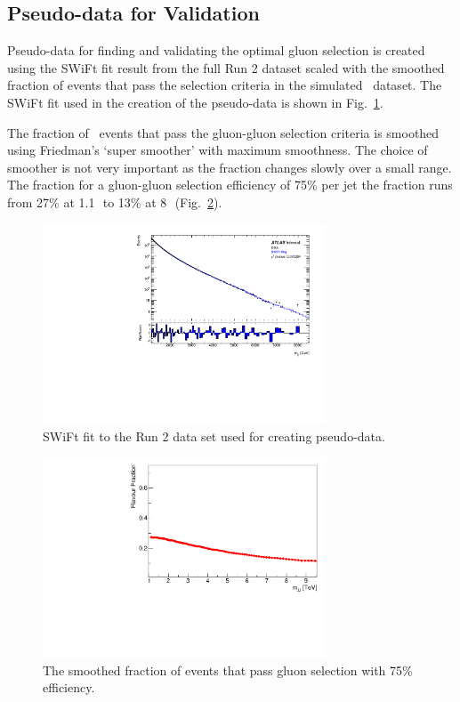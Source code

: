 \subsection{Pseudo-data for Validation}
\label{sec:pseudo}

Pseudo-data for finding and validating the optimal gluon selection is created using the 
SWiFt fit result from the full Run 2 dataset scaled with the smoothed 
fraction of events that pass the selection criteria in the simulated \QCD\  dataset. 
The SWiFt fit used in the creation of the pseudo-data is shown in Fig.~\ref{fig:SWiFt_Run2}.

The fraction of \QCD\ events that pass the gluon-gluon selection criteria is smoothed
using Friedman's `super smoother' with maximum smoothness. The choice of smoother is not 
very important as the 
fraction changes slowly over a small range. The fraction for a gluon-gluon selection efficiency of 
75\% per jet the fraction runs from 27\% at 1.1\,\TeV\ to 13\% at 8\,\TeV\ (Fig.~\ref{fig:Smoothed_GG_Fraction}).

\begin{figure}[htb]
 \centering
\includegraphics[width=0.75\textwidth]{figures/04-BackgroundEstimation/SWiFtData15-18.pdf}
\caption{SWiFt fit to the Run 2 data set used for creating pseudo-data.  \label{fig:SWiFt_Run2}}
\end{figure}

\begin{figure}[htb]
 \centering
\includegraphics[width=0.75\textwidth]{figures/04-BackgroundEstimation/fracSmoothSelected_GG_New_Selection5.pdf}
\caption{The smoothed fraction of events that pass gluon selection with 75\% efficiency.   \label{fig:Smoothed_GG_Fraction}}
\end{figure}

